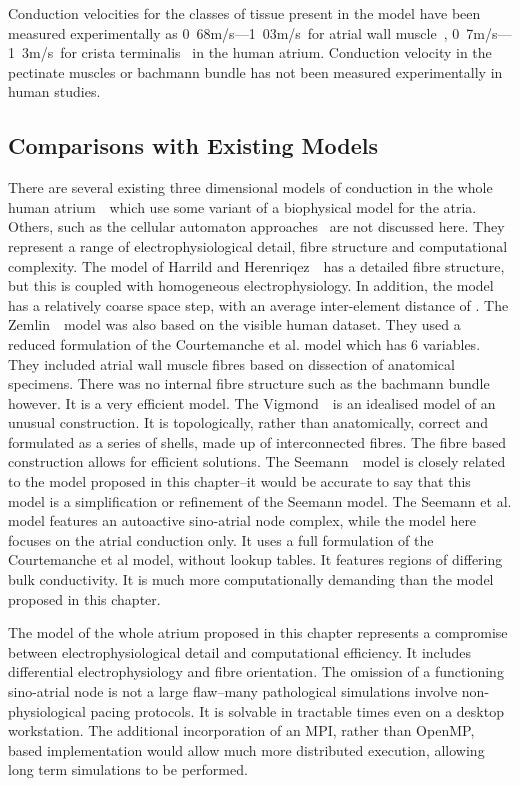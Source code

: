 Conduction velocities for the classes of tissue present in the model have been
measured experimentally as \unit{0.68}{m/s}---\unit{1.03}{m/s}\ for atrial wall
muscle~\cite{Hansson1998}, \unit{0.7}{m/s}---\unit{1.3}{m/s}\ for crista
terminalis~\cite{Boineau1988} in the human atrium.
Conduction velocity in the pectinate muscles or bachmann bundle has not been
measured experimentally in human studies.

\subsection{Comparisons with Existing Models}

There are several existing three dimensional models of conduction in the whole
human atrium~\cite{Harrild2000,Zemlin2000,Vigmond2001,Seemann2006}\ which use
some variant of a biophysical model for the atria.
Others, such as the cellular automaton approaches~\cite{Reumann2007} are not discussed here.
They represent a range of electrophysiological detail, fibre structure and
computational complexity.
The model of Harrild and Herenriqez~\cite{Harrild2000}\ has a detailed fibre
structure, but this is coupled with homogeneous electrophysiology.
In addition, the model has a relatively coarse space step, with an average
inter-element distance of .
The Zemlin~\cite{Zemlin2000}\ model was also based on the visible human dataset.
They used a reduced formulation of the Courtemanche et al. model which has 6
variables.
They included atrial wall muscle fibres based on dissection of anatomical
specimens.
There was no internal fibre structure such as the bachmann bundle however.
It is a very efficient model.
The Vigmond~\cite{Vigmond2001}\ is an idealised model of an unusual construction.
It is topologically, rather than anatomically, correct and formulated as a
series of shells, made up of interconnected fibres.
The fibre based construction allows for efficient solutions.
The Seemann~\cite{Seemann2006}\ model is closely related to the model proposed in this
chapter--it would be accurate to say that this model is a simplification or
refinement of the Seemann model. 
The Seemann et al. model features an autoactive sino-atrial node complex, while
the model here focuses on the atrial conduction only.
It uses a full formulation of the Courtemanche et al model, without lookup
tables.
It features regions of differing bulk conductivity.
It is much more computationally demanding than the model proposed in this
chapter.

The model of the whole atrium proposed in this chapter represents a compromise
between electrophysiological detail and computational efficiency.
It includes differential electrophysiology and fibre orientation.
The omission of a functioning sino-atrial node is not a large flaw--many
pathological simulations involve non-physiological pacing protocols.
It is solvable in tractable times even on a desktop workstation.
The additional incorporation of an MPI, rather than OpenMP, based implementation
would allow much more distributed execution, allowing long term simulations to
be performed.



